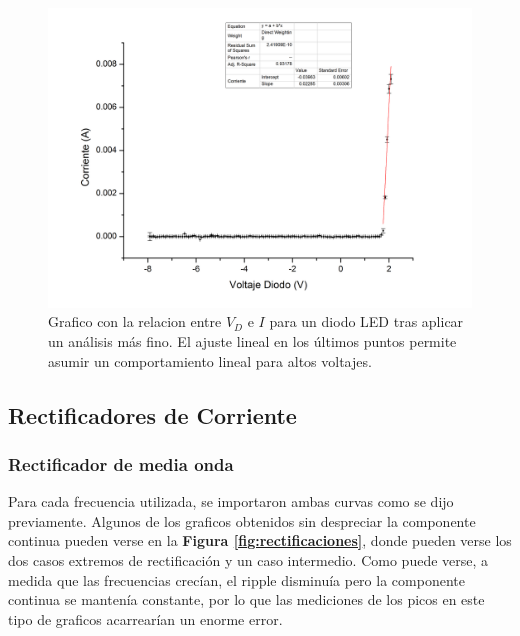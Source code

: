\documentclass[11pt,a4paper]{article}
\begin{document}
\begin{figure}[H]
\centering
\includegraphics[scale=0.5]{LED}
   \caption{Grafico con la relacion entre $V_D$ e $I$ para un diodo LED tras aplicar un análisis más fino. El ajuste lineal en los últimos puntos permite asumir un comportamiento lineal para altos voltajes.}
   \label{fig:LED}
\end{figure}



\subsection{Rectificadores de Corriente}



\subsubsection{Rectificador de media onda}

Para cada frecuencia utilizada, se importaron ambas curvas como se dijo previamente. Algunos de los graficos obtenidos sin despreciar la componente continua pueden verse en la \textbf{Figura \ref{fig:rectificaciones}}, donde pueden verse los dos casos extremos de rectificación y un caso intermedio. Como puede verse, a medida que las frecuencias crecían, el ripple disminuía pero la componente continua se mantenía constante, por lo que las mediciones de los picos en este tipo de graficos acarrearían un enorme error. 
\end{document}
